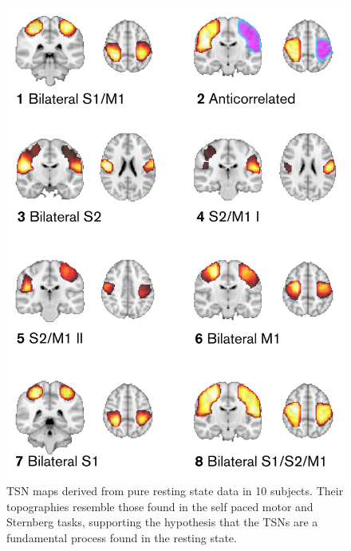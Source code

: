 \begin{figure}[h]
	\begin{center}
		\includegraphics[width=0.75\linewidth]{./images/chapter5/Figure_7.png}
		\caption{TSN maps derived from pure resting state data in 10 subjects. Their topographies resemble those found in the self paced motor and Sternberg tasks, supporting the hypothesis that the TSNs are a fundamental process found in the resting state.\label{figure_5_7}}
	\end{center}
\end{figure}